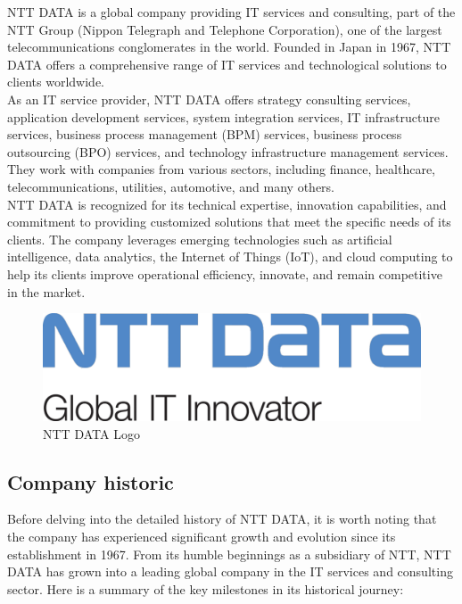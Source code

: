 NTT DATA is a global company providing IT services and consulting, part of the NTT Group (Nippon Telegraph and Telephone Corporation), one of the largest telecommunications conglomerates in the world. Founded in Japan in 1967, NTT DATA offers a comprehensive range of IT services and technological solutions to clients worldwide.\\

As an IT service provider, NTT DATA offers strategy consulting services, application development services, system integration services, IT infrastructure services, business process management (BPM) services, business process outsourcing (BPO) services, and technology infrastructure management services. They work with companies from various sectors, including finance, healthcare, telecommunications, utilities, automotive, and many others.\\

NTT DATA is recognized for its technical expertise, innovation capabilities, and commitment to providing customized solutions that meet the specific needs of its clients. The company leverages emerging technologies such as artificial intelligence, data analytics, the Internet of Things (IoT), and cloud computing to help its clients improve operational efficiency, innovate, and remain competitive in the market.

\begin{figure}[h!]
	\centering
	\includegraphics[width=0.8\linewidth]{Image/nttgloballogo.png}
	\caption{NTT DATA Logo}
	\label{fig:NTT DATA Logo}
\end{figure}
\pagebreak

\subsection{Company historic}

Before delving into the detailed history of NTT DATA, it is worth noting that the company has experienced significant growth and evolution since its establishment in 1967. From its humble beginnings as a subsidiary of NTT, NTT DATA has grown into a leading global company in the IT services and consulting sector. Here is a summary of the key milestones in its historical journey:

